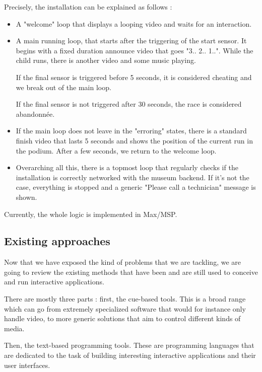 \documentclass{sigchi}
\begin{document}
Precisely, the installation can be explained as follows : 
\begin{itemize}
    \item A "welcome" loop that displays a looping video and waits for an interaction.
    \item A main running loop, that starts after the triggering of the start sensor. It begins with a fixed duration announce video that goes "3.. 2.. 1..". While the child runs, there is another video and some music playing. 
    
    If the final sensor is triggered before 5 seconds, it is considered cheating and we break out of the main loop.
    
    If the final sensor is not triggered after 30 seconds, the race is considered abandonnée. 
    
    \item If the main loop does not leave in the "erroring" states, there is a standard finish video that lasts 5 seconds and shows the position of the current run in the podium. After a few seconds, we return to the welcome loop.
    
    \item Overarching all this, there is a topmost loop that regularly checks if the installation is correctly networked with the museum backend. If it's not the case, everything is stopped and a generic "Please call a technician" message is shown.
\end{itemize}

Currently, the whole logic is implemented in Max/MSP.

\subsection{Existing approaches}
Now that we have exposed the kind of problems that we are tackling, we are going to review the existing methods that have been and are still used to conceive and run interactive applications.

There are mostly three parts : first, the cue-based tools. This is a broad range which can go from extremely specialized software that would for instance only handle video, to more generic solutions that aim to control different kinds of media.

Then, the text-based programming tools. These are programming languages that are dedicated to the task of building interesting interactive applications and their user interfaces.
\end{document}
